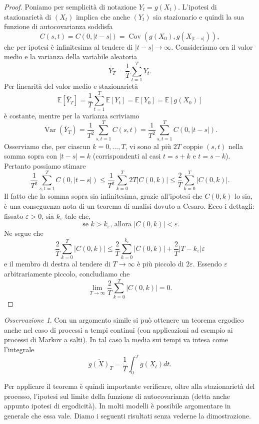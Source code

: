 \documentclass[
  italian,
  letterpaper,
]{book}
\newcommand{\bra}[1]{\left( #1 \right)}
\newcommand{\sqa}[1]{\left[ #1 \right]}
\newcommand{\E}[1]{\mathbb{E}\sqa{#1}}
\newcommand{\Var}[1]{\operatorname{Var}\bra{#1}}
\newcommand{\Cov}[1]{\operatorname{Cov}\bra{#1}}
\theoremstyle{definition}
\theoremstyle{remark}
\newtheorem*{remark}{Osservazione}
\begin{document}
\begin{proof}
Poniamo per semplicità di notazione \(Y_t = g(X_t)\). L'ipotesi di
stazionarietà di \((X_t)\) implica che anche \((Y_t)\) sia stazionario e
quindi la sua funzione di autocovarianza soddisfa
\[ C(s,t) =  C(0, |t-s|) = \Cov{g(X_0), g(X_{|t-s|})},\] che per ipotesi
è infinitesima al tendere di \(|t-s| \to \infty\). Consideriamo ora il
valor medio e la varianza della variabile aleatoria
\[\bar{Y}_T = \frac 1 T \sum_{t=1}^TY_t.\] Per linearità del valor medio
e stazionarietà
\[ \E{ \bar{Y}_T} = \frac 1 T \sum_{t=1}^T \E{Y_t} = \E{Y_0} = \E{g(X_0)}\]
è costante, mentre per la varianza scriviamo
\[\Var{\bar{Y}_T } = \frac 1 {T^2} \sum_{s,t=1}^T C(s,t) = \frac 1 {T^2} \sum_{s,t=1}^T C(0,|t-s|) .\]
Osserviamo che, per ciascun \(k=0, \ldots, T\), vi sono al più \(2T\)
coppie \((s,t)\) nella somma sopra con \(|t-s| = k\) (corrispondenti al
casi \(t=s+k\) e \(t=s-k\)). Pertanto possiamo stimare
\[ \frac 1 {T^2} \sum_{s,t=1}^T C(0,|t-s|) \le \frac{1}{T^2} \sum_{k=0}^T 2 T |C(0,k)| \le \frac{2}{T} \sum_{k=0}^T  |C(0,k)|.\]
Il fatto che la somma sopra sia infinitesima, grazie all'ipotesi che
\(C(0,k)\) lo sia, è una conseguenza nota di un teorema di analisi
dovuto a Cesaro. Ecco i dettagli: fissato \(\varepsilon>0\), sia
\(k_{\varepsilon}\) tale che, \[
\text{ se $k> k_{\varepsilon}$, allora $|C(0,k)| < \varepsilon$.}
\] Ne segue che
\[ \frac{2}{T} \sum_{k=0}^T  |C(0,k)| \le \frac{2}{T} \sum_{k=0}^{k_\varepsilon} |C(0,k)| + \frac{2}{T} |T-k_{\varepsilon}| \varepsilon\]
e il membro di destra al tendere di \(T \to \infty\) è più piccolo di
\(2 \varepsilon\). Essendo \(\varepsilon\) arbitrariamente piccolo,
concludiamo che
\[\lim_{ T \to \infty} \frac{2}{T} \sum_{k=0}^T  |C(0,k)| = 0.\]
\end{proof}

\begin{remark}
Con un argomento simile si può ottenere un teorema ergodico anche nel
caso di processi a tempi continui (con applicazioni ad esempio ai
processi di Markov a salti). In tal caso la media sui tempi va intesa
come l'integrale \[ \overline{g(X)}_T = \frac 1 T \int_0^T g(X_t) dt.\]
\end{remark}

Per applicare il teorema è quindi importante verificare, oltre alla
stazionarietà del processo, l'ipotesi sul limite della funzione di
autocovarianza (detta anche appunto ipotesi di ergodicità). In molti
modelli è possibile argomentare in generale che essa vale. Diamo i
seguenti risultati senza vederne la dimostrazione.
\end{document}
